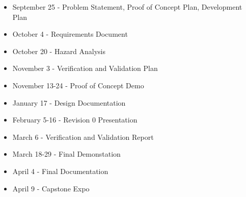 \documentclass{article}
\begin{document}
\begin{itemize}
	\item September 25 - Problem Statement, Proof of Concept Plan, Development Plan
	\item October 4 - Requirements Document
	\item October 20 - Hazard Analysis
	\item November 3 - Verification and Validation Plan
	\item November 13-24 - Proof of Concept Demo
	\item January 17 - Design Documentation
	\item February 5-16 - Revision 0 Presentation
	\item March 6 - Verification and Validation Report
	\item March 18-29 - Final Demonstation
	\item April 4 - Final Documentation
	\item April 9 - Capstone Expo
\end {itemize}
\end{document}
